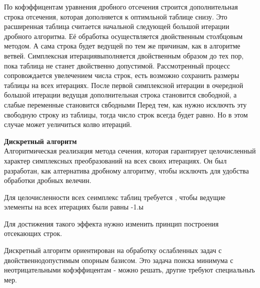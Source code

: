 По кофэффицентам уравнения дробного отсечения строится дополнительная строка отсечения, которая дополняется к оптимльной таблице снизу.
Это расширенная таблица считается начальной следующей большой итерации дробного алгоритма.
Её обработка осуществляется двойственным столбцовым методом.
А сама строка будет ведущей по тем же причинам, как в алгоритме ветвей.
Симплексная итерациявыполняется двойственным образом до тех пор, пока таблица не станет двойственно допустимой.
Рассмотренный процесс сопровождается увелечением числа строк, есть возможно сохранить размеры таблицы на всех итерациях.
После первой симплексной итерации в очередной большой итерации ведущая дополнительная строка становится свободной,
а слабые переменные становится свбодными
Перед тем, как нужно исключть эту свободную строку из таблицы, тогда число строк всегда будет равно.
Но в этом случае может уеличиться колво итераций.



\Large{ \textbf {Дискретный алгоритм}}\\

Алгоритмическая реализация метода сечения, которая гарантирует целочисленный характер симплексных преобразований на всех своих итерациях.
Он был разработан, как алтернатива дробному алгоритму, чтобы исключть для удобства обработки дробных велечин.

Для целочисленности всех сеимплекс таблиц требуется , чтобы ведущие элементы на всех итерациях были равны -1.ы

Для достижения такого эффекта нужно изменить принцип построения отсекающих строк.

Дискретный алгоритм ориентирован на обработку ослабленных задач с двойственнодопустимым опорным базисом.
Это задача поиска минимума с неотрицательными кофэффицентам - можно решать, другие требуют специальныъ мер.


